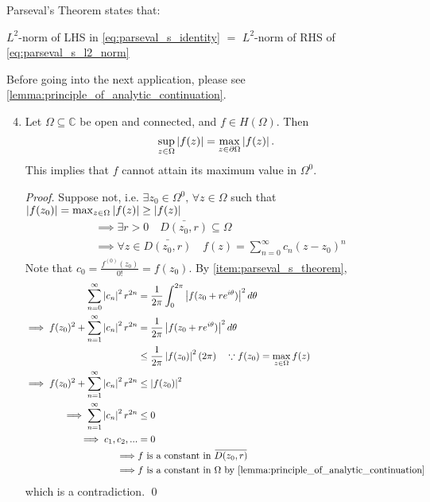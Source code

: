 \documentclass[notoc,notitlepage]{tufte-book}
\begin{document}
\begin{ex}
\begin{enumerate}
			Parseval's Theorem states that:

			$L^2$-norm of LHS in \cref{eq:parseval_s_identity} $=$ $L^2$-norm of RHS of \cref{eq:parseval_s_l2_norm}
	\end{enumerate}

	Before going into the next application, please see \cref{lemma:principle_of_analytic_continuation}.

	\begin{enumerate}
		\setcounter{enumi}{3}
		\item {} Let $\Omega \subseteq \mathbb{C}$ be open and connected, and $f \in H(\Omega)$. Then \label{item:maximum_modulus_principle}
		\begin{equation*}
			\sup_{z \in \Omega} \left|f(z)\right| = \max_{z \in \partial \Omega} \left|f(z)\right|.
		\end{equation*}
		This implies that $f$ cannot attain its maximum value in $\Omega^0$.

			\begin{proof}
				Suppose not, i.e. $\exists z_0 \in \Omega^0, \, \forall z \in \Omega$ such that $\left|f(z_0)\right| = \max_{z \in \Omega} \left|f(z)\right| \geq \left|f(z)\right|$
				\begin{align*}
					&\implies \exists r > 0 \quad \bar{D(z_0, r)} \subseteq \Omega \\
					&\implies \forall z \in \bar{D(z_0, r)} \quad f(z) = \sum_{n=0}^{\infty} c_n (z - z_0)^n
				\end{align*}
				Note that $c_0 = \frac{f^{(0)}(z_0)}{0!} = f(z_0)$. By \cref{item:parseval_s_theorem},
				\begin{align*}
					\sum_{n=0}^{\infty} \abs{c_n}^2 r^{2n} &= \frac{1}{2\pi} \int_{0}^{2 \pi} \abs{f(z_0 + re^{i \theta})}^2 \dif{\theta} \\
					\implies  f(z_0)^2 + \sum_{n=1}^{\infty} \abs{c_n}^2 r^{2n} & = \frac{1}{2 \pi} \abs{f(z_0 + re^{i \theta})}^2 \dif{\theta} \\
					& \leq \frac{1}{2 \pi} \abs{f(z_0)}^2 (2 \pi) \quad \because f(z_0) = \max_{z \in \Omega} f(z) \\
					\implies  f(z_0)^2 + \sum_{n=1}^{\infty} \abs{c_n}^2 r^{2n} & \leq \abs{f(z_0)}^2 \\
					\implies  \sum_{n=1}^{\infty} \abs{c_n}^2 r^{2n} & \leq 0 \\
					\implies c_1, c_2, ... & = 0 \\
					\implies & f \text{ is a constant in } \bar{D(z_0, r)} \\
					\implies & f \text{ is a constant in } \Omega \text{ by } \cref{lemma:principle_of_analytic_continuation}
				\end{align*}
				which is a contradiction. \qed
			\end{proof}
	\end{enumerate}

\end{ex}
\end{document}
